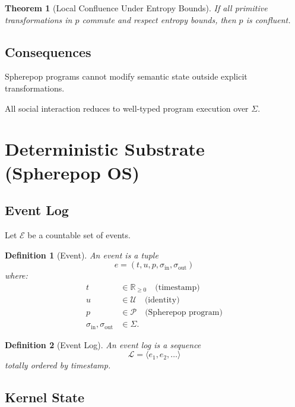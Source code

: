 \documentclass[11pt]{article}
\newtheorem{definition}{Definition}
\newtheorem{theorem}{Theorem}
\begin{document}
\begin{theorem}[Local Confluence Under Entropy Bounds]
If all primitive transformations in $p$ commute and respect entropy bounds, then $p$ is
confluent.
\end{theorem}

\subsection{Consequences}

\begin{corollary}
Spherepop programs cannot modify semantic state outside explicit transformations.
\end{corollary}

\begin{corollary}
All social interaction reduces to well-typed program execution over $\Sigma$.
\end{corollary}

\section{Deterministic Substrate (Spherepop OS)}

\subsection{Event Log}

Let $\mathcal{E}$ be a countable set of events.

\begin{definition}[Event]
An event is a tuple
\[
e = (t, u, p, \sigma_{\text{in}}, \sigma_{\text{out}})
\]
where:
\begin{align*}
t &\in \mathbb{R}_{\ge 0} \quad \text{(timestamp)} \\
u &\in \mathcal{U} \quad \text{(identity)} \\
p &\in \mathcal{P} \quad \text{(Spherepop program)} \\
\sigma_{\text{in}}, \sigma_{\text{out}} &\in \Sigma.
\end{align*}
\end{definition}

\begin{definition}[Event Log]
An event log is a sequence
\[
\mathcal{L} = \langle e_1, e_2, \dots \rangle
\]
totally ordered by timestamp.
\end{definition}

\subsection{Kernel State}
\end{document}
